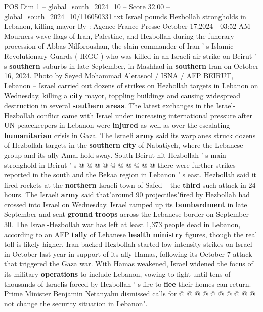 \begin{textsample}{POS Dim 1 – global\_south\_2024\_10 – Score 32.00 – global\_south\_2024\_10/116050331.txt}  \label{ex:f1_pos_167}
Israel pounds Hezbollah strongholds in Lebanon, killing mayor By : Agence France Presse October 17,2024 - 03:52 AM Mourners wave flags of Iran, Palestine, and Hezbollah during the funerary procession of Abbas Nilforoushan, the slain commander of Iran ' s Islamic Revolutionary Guards ( IRGC ) who was killed in an Israeli air strike on Beirut ' s \textbf{southern} suburbs in late September, in Mashhad in \textbf{southern} Iran on October 16, 2024.
Photo by Seyed Mohammad Alerasool / ISNA / AFP BEIRUT, Lebanon -- Israel carried out dozens of strikes on Hezbollah targets in Lebanon on Wednesday, killing a \textbf{city} mayor, toppling buildings and causing widespread destruction in several \textbf{southern} \textbf{areas}.
The latest exchanges in the Israel-Hezbollah conflict came with Israel under increasing international pressure after UN peacekeepers in Lebanon were \textbf{injured} as well as over the escalating \textbf{humanitarian} crisis in Gaza.
The Israeli \textbf{army} said its warplanes struck dozens of Hezbollah targets in the \textbf{southern} \textbf{city} of Nabatiyeh, where the Lebanese group and its ally Amal hold sway.
South Beirut hit Hezbollah ' s main stronghold in Beirut ' s @ @ @ @ @ @ @ @ @ @ there were further strikes reported in the south and the Bekaa region in Lebanon ' s east.
Hezbollah said it fired rockets at the \textbf{northern} Israeli town of Safed -- the \textbf{third} such attack in 24 hours.
The Israeli \textbf{army} said that"around 90 projectiles"fired by Hezbollah had crossed into Israel on Wednesday.
Israel ramped up its \textbf{bombardment} in late September and sent \textbf{ground} \textbf{troops} across the Lebanese border on September 30.
The Israel-Hezbollah war has left at least 1,373 people dead in Lebanon, according to an AFP \textbf{tally} of Lebanese \textbf{health} \textbf{ministry} figures, though the real toll is likely higher.
Iran-backed Hezbollah started low-intensity strikes on Israel in October last year in support of its ally Hamas, following its October 7 attack that triggered the Gaza war.
With Hamas weakened, Israel widened the focus of its military \textbf{operations} to include Lebanon, vowing to fight until tens of thousands of Israelis forced by Hezbollah ' s fire to \textbf{flee} their homes can return.
Prime Minister Benjamin Netanyahu dismissed calls for @ @ @ @ @ @ @ @ @ @ not change the security situation in Lebanon".

\end{textsample}
